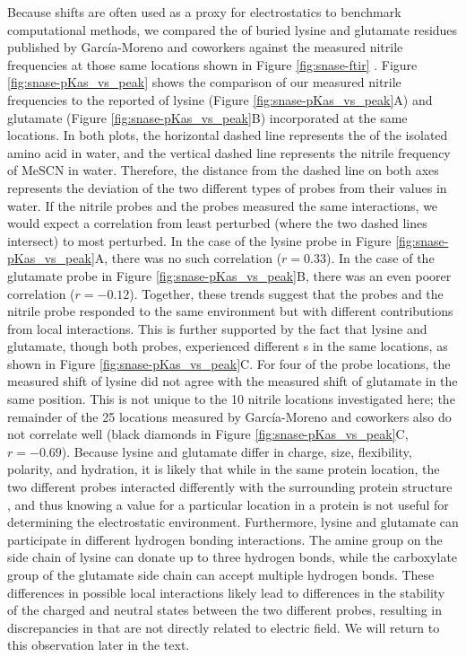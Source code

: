 Because \pKa{} shifts are often used as a proxy for electrostatics to benchmark computational methods, we compared the \dpKa{} of buried lysine and glutamate residues published by Garc\'ia-Moreno and coworkers against the measured nitrile frequencies at those same locations shown in Figure \ref{fig:snase-ftir} \cite{Isom2010, Isom2011}. 
Figure \ref{fig:snase-pKas_vs_peak} shows the comparison of our measured nitrile frequencies to the reported \pKa{} of lysine (Figure \ref{fig:snase-pKas_vs_peak}A) and glutamate (Figure \ref{fig:snase-pKas_vs_peak}B) incorporated at the same locations. 
In both plots, the horizontal dashed line represents the \pKa{} of the isolated amino acid in water, and the vertical dashed line represents the nitrile frequency of MeSCN in water. 
Therefore, the distance from the dashed line on both axes represents the deviation of the two different types of probes from their values in water. 
If the nitrile probes and the \pKa{} probes measured the same interactions, we would expect a correlation from least perturbed (where the two dashed lines intersect) to most perturbed. 
In the case of the lysine probe in Figure \ref{fig:snase-pKas_vs_peak}A, there was no such correlation ($r = 0.33$). 
In the case of the glutamate probe in Figure \ref{fig:snase-pKas_vs_peak}B, there was an even poorer correlation ($r = -0.12$). 
Together, these trends suggest that the \pKa{} probes and the nitrile probe responded to the same environment but with different contributions from local interactions. 
This is further supported by the fact that lysine and glutamate, though both \pKa{} probes, experienced different \dpKa{}s in the same locations, as shown in Figure \ref{fig:snase-pKas_vs_peak}C. 
For four of the probe locations, the measured \pKa{} shift of lysine did not agree with the measured \pKa{} shift of glutamate in the same position. 
This is not unique to the 10 nitrile locations investigated here; 
the remainder of the 25 locations measured by Garc\'ia-Moreno and coworkers also do not correlate well (black diamonds in Figure \ref{fig:snase-pKas_vs_peak}C, $r = -0.69$). 
Because lysine and glutamate differ in charge, size, flexibility, polarity, and hydration, it is likely that while in the same protein location, the two different \pKa{} probes interacted differently with the surrounding protein structure \cite{Harms2009, Isom2011}, and thus knowing a \dpKa{} value for a particular location in a protein is not useful for determining the electrostatic environment. 
Furthermore, lysine and glutamate can participate in different hydrogen bonding interactions. 
The amine group on the side chain of lysine can donate up to three hydrogen bonds, while the carboxylate group of the glutamate side chain can accept multiple hydrogen bonds. 
These differences in possible local interactions likely lead to differences in the stability of the charged and neutral states between the two different \pKa{} probes, resulting in discrepancies in \dpKa{} that are not directly related to electric field. 
We will return to this observation later in the text.

